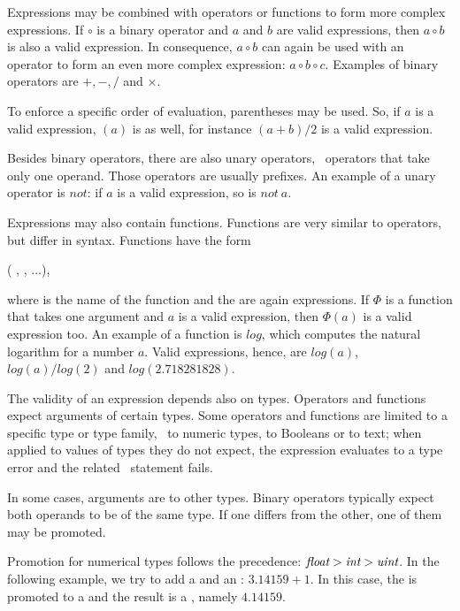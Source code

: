 Expressions may be combined
with operators or functions
to form more complex expressions.
If $\circ$ is a binary operator
and $a$ and $b$ are valid expressions,
then
$a \circ b$
is also a valid expression.
In consequence, $a \circ b$ can
again be used with an operator
to form an even more complex
expression:
$a \circ b \circ c$.
Examples of binary operators are
$+, -, /$ and $\times$.

To enforce a specific order of
evaluation, parentheses may be used.
So, if $a$ is a valid expression,
$(a)$ is as well, for instance
$(a+b)/2$
is a valid expression.

Besides binary operators, there are also
unary operators, \ie\ operators that
take only one operand. Those operators
are usually prefixes. An example of
a unary operator is $not$:
if $a$ is a valid expression,
so is $not~a$.

Expressions may also contain
functions. Functions are very
similar to operators, but differ
in syntax. Functions have the
form

(
,
,
$\dots$),

where  is the name
of the function and the 
are again expressions.
If $\Phi$ is a function
that takes one argument and
$a$ is a valid expression,
then $\Phi(a)$ is a valid expression too.
An example of a function is $log$,
which computes the natural logarithm
for a number $a$. Valid expressions,
hence, are $log(a)$, $log(a)/log(2)$ and
$log(2.718281828)$.

The validity of an expression depends
also on types. Operators and functions
expect arguments of certain types.
Some operators and functions are limited
to a specific type or type family,
\eg\ to numeric types,
to Booleans or to text; when applied
to values of types they do not expect,
the expression evaluates to a type error
and the related \sql\ statement fails.

In some cases, arguments are 
to other types. Binary operators typically
expect both operands to be of the same type.
If one differs from the other, one of them
may be promoted.

Promotion for numerical types follows 
the precedence:
$\textit{float} > \textit{int} > \textit{uint}$.
In the following example, we try to
add a  and an :
$3.14159 + 1$. In this case, the 
is promoted to a  and the
result is a ,
namely $4.14159$.

